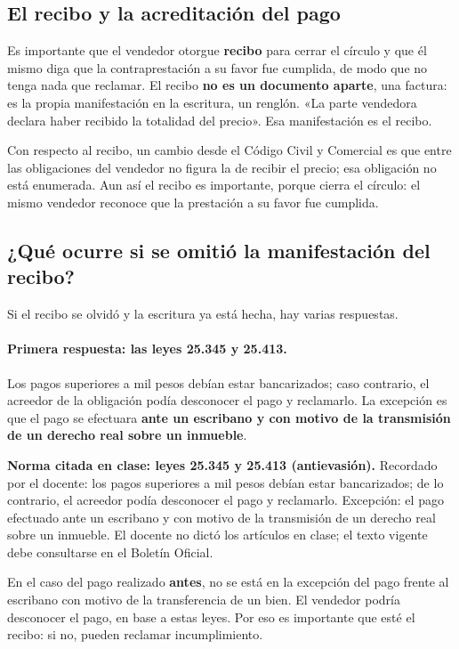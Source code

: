\documentclass[12pt,oneside]{book}
\begin{document}
\subsection{El recibo y la acreditación del pago}

Es importante que el vendedor otorgue \textbf{recibo} para cerrar el círculo y que él mismo diga que la contraprestación a su favor fue cumplida, de modo que no tenga nada que reclamar. El recibo \textbf{no es un documento aparte}, una factura: es la propia manifestación en la escritura, un renglón. «La parte vendedora declara haber recibido la totalidad del precio». Esa manifestación es el recibo.

Con respecto al recibo, un cambio desde el Código Civil y Comercial es que entre las obligaciones del vendedor no figura la de recibir el precio; esa obligación no está enumerada. Aun así el recibo es importante, porque cierra el círculo: el mismo vendedor reconoce que la prestación a su favor fue cumplida.

\subsection{¿Qué ocurre si se omitió la manifestación del recibo?}

Si el recibo se olvidó y la escritura ya está hecha, hay varias respuestas.

\paragraph{Primera respuesta: las leyes 25.345 y 25.413.}
Los pagos superiores a mil pesos debían estar bancarizados; caso contrario, el acreedor de la obligación podía desconocer el pago y reclamarlo. La excepción es que el pago se efectuara \textbf{ante un escribano y con motivo de la transmisión de un derecho real sobre un inmueble}.

\begin{note}
\textbf{Norma citada en clase: leyes 25.345 y 25.413 (antievasión).} Recordado por el docente: los pagos superiores a mil pesos debían estar bancarizados; de lo contrario, el acreedor podía desconocer el pago y reclamarlo. Excepción: el pago efectuado ante un escribano y con motivo de la transmisión de un derecho real sobre un inmueble. El docente no dictó los artículos en clase; el texto vigente debe consultarse en el Boletín Oficial.
\end{note}

En el caso del pago realizado \textbf{antes}, no se está en la excepción del pago frente al escribano con motivo de la transferencia de un bien. El vendedor podría desconocer el pago, en base a estas leyes. Por eso es importante que esté el recibo: si no, pueden reclamar incumplimiento.
\end{document}

